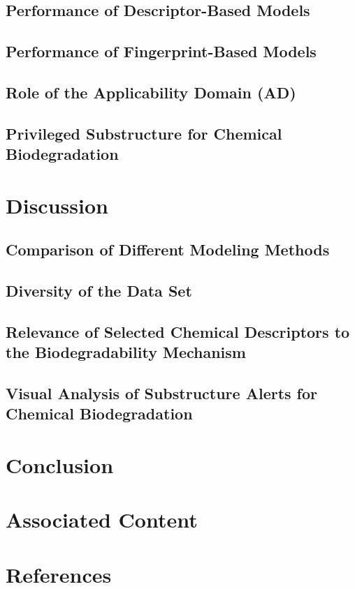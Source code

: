 \documentclass[10pt, letter]{report}
\renewcommand{\=}{\, =\, }
\newcommand{\+}{\, +\, }
\renewcommand{\-}{\, -\, }
\begin{document}
\section{Performance of Descriptor-Based Models}

\section{Performance of Fingerprint-Based Models}

\section{Role of the Applicability Domain (AD)}

\section{Privileged Substructure for Chemical Biodegradation}

\chapter{Discussion}

\section{Comparison of Different Modeling Methods}

\section{Diversity of the Data Set}

\section{Relevance of Selected Chemical Descriptors to the Biodegradability Mechanism}

\section{Visual Analysis of Substructure Alerts for Chemical Biodegradation}

\chapter{Conclusion}

\chapter{Associated Content}

\chapter{References}
\end{document}
